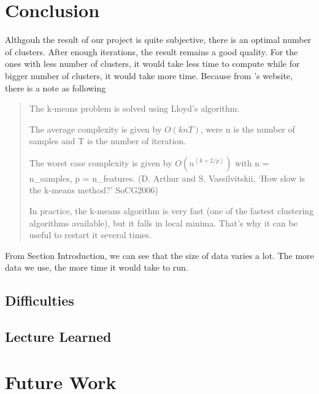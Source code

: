 \section{Conclusion}

Althgouh the result of our project is quite subjective, there is an optimal number of clusters. After enough iterations, the result remains a good quality. For the ones with less number of clusters, it would take less time to compute while for bigger number of clusters, it would take more time. Because from \cite{sklearn}'s website, there is a note as following
\begin{quote}
The k-means problem is solved using Lloyd’s algorithm.

The average complexity is given by $O(k n T)$, were n is the number of samples and T is the number of iteration.

The worst case complexity is given by $O(n^{(k+2/p)})$ with n = n\_samples, p = n\_features. (D. Arthur and S. Vassilvitskii, `How slow is the k-means method?' SoCG2006)

In practice, the k-means algorithm is very fast (one of the fastest clustering algorithms available), but it falls in local minima. That’s why it can be useful to restart it several times.
\end{quote}

From Section {\color{red}Introduction}, we can see that the size of data varies a lot. The more data we use, the more time it would take to run. 

\subsection{Difficulties}

\subsection{Lecture Learned}

\section{Future Work}

